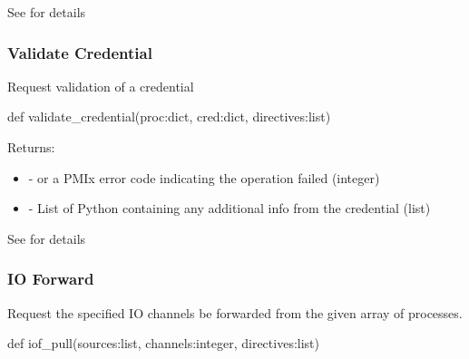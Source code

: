 See  for details


\subsubsection{Validate Credential}

\summary

Request validation of a credential

\format

\pyspecificstart
\begin{codepar}
def validate_credential(proc:dict, cred:dict, directives:list)
\end{codepar}
\pyspecificend

\begin{arglist}
\end{arglist}

Returns:
\begin{itemize}
    \item {} -  or a \ac{PMIx} error code indicating the operation failed (integer)
    \item {} - List of Python  containing any additional info from the credential (list)
\end{itemize}

See  for details


\subsubsection{IO Forward}

\summary

Request the specified IO channels be forwarded from the given array of processes.

\format

\pyspecificstart
\begin{codepar}
def iof_pull(sources:list, channels:integer, directives:list)
\end{codepar}
\pyspecificend

\begin{arglist}
\end{arglist}

